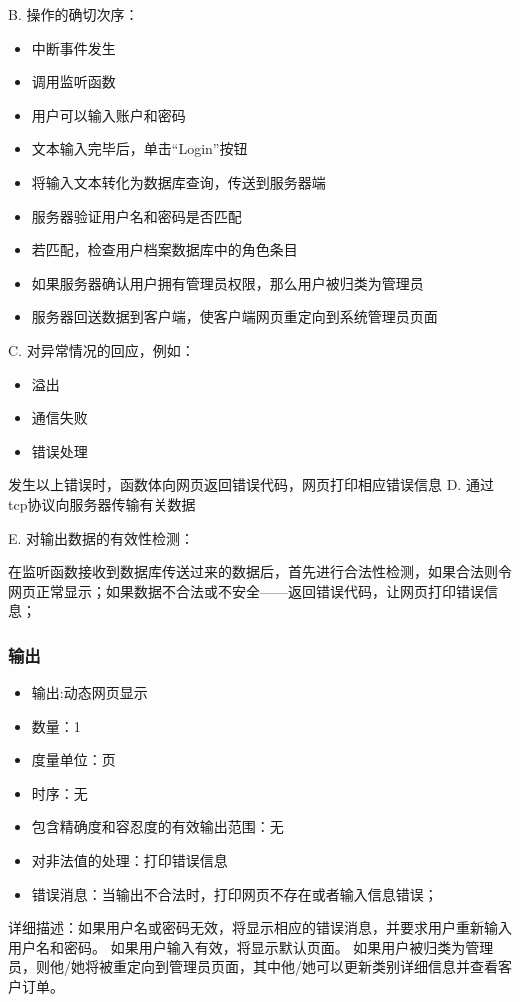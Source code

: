 B. 操作的确切次序：
\begin{adjustwidth}{2cm}{1cm}\qquad
	\begin{itemize}
		\item 中断事件发生
		\item 调用监听函数
		\item 用户可以输入账户和密码
		\item 文本输入完毕后，单击“Login”按钮
		\item 将输入文本转化为数据库查询，传送到服务器端
		\item 服务器验证用户名和密码是否匹配
		\item 若匹配，检查用户档案数据库中的角色条目
		\item 如果服务器确认用户拥有管理员权限，那么用户被归类为管理员
		\item 服务器回送数据到客户端，使客户端网页重定向到系统管理员页面
	\end{itemize}		
\end{adjustwidth}
 

C. 对异常情况的回应，例如：
\begin{adjustwidth}{2cm}{1cm}\qquad
	\begin{itemize}
		\item 溢出
		\item 通信失败
		\item 错误处理
	\end{itemize}		
\end{adjustwidth}

	发生以上错误时，函数体向网页返回错误代码，网页打印相应错误信息
D. 通过tcp协议向服务器传输有关数据
		
E. 对输出数据的有效性检测：

在监听函数接收到数据库传送过来的数据后，首先进行合法性检测，如果合法则令网页正常显示；如果数据不合法或不安全——返回错误代码，让网页打印错误信息；

\subsubsection{输出}
\begin{itemize}
	\item	输出:动态网页显示
	\item	数量：1
	\item	度量单位：页
	\item	时序：无
	\item	包含精确度和容忍度的有效输出范围：无
	\item	对非法值的处理：打印错误信息
	\item	错误消息：当输出不合法时，打印网页不存在或者输入信息错误；
   \end{itemize}
   详细描述：如果用户名或密码无效，将显示相应的错误消息，并要求用户重新输入用户名和密码。
   如果用户输入有效，将显示默认页面。
   如果用户被归类为管理员，则他/她将被重定向到管理员页面，其中他/她可以更新类别详细信息并查看客户订单。





